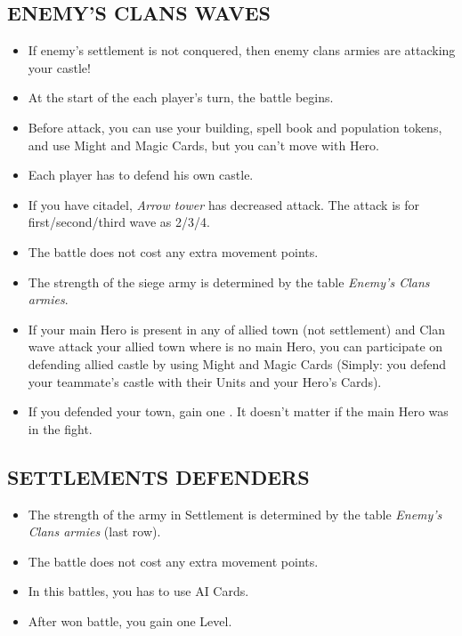 \begin{multicols*}{2}
\subsection*{\MakeUppercase{Enemy's clans waves}}
\begin{itemize}
  \item If enemy's settlement is not conquered, then enemy clans armies are attacking your castle!
  \item At the start of the each player's turn, the battle begins.
  \item Before attack, you can use your building, spell book and population tokens, and use Might and Magic Cards, but you can't move with Hero.
  \item Each player has to defend his own castle.
  \item If you have citadel, \textit{Arrow tower} has decreased attack. The attack is for first/second/third wave as 2/3/4.
  \item The battle does not cost any extra movement points.
  \item The strength of the siege army is determined by the table \textit{Enemy's Clans armies}.
  \item If your main Hero is present in any of allied town (not settlement) and Clan wave attack your allied town where is no main Hero, you can participate on defending allied castle by using Might and Magic Cards (Simply: you defend your teammate's castle with their Units and your Hero's Cards).
  \item If you defended your town, gain one . It doesn't matter if the main Hero was in the fight.
\end{itemize}

\subsection*{\MakeUppercase{Settlements defenders}}
\begin{itemize}
  \item The strength of the army in Settlement is determined by the table \textit{Enemy's Clans armies} (last row).
  \item The battle does not cost any extra movement points.
  \item In this battles, you has to use AI Cards.
  \item After won battle, you gain one Level.
\end{itemize}

\end{multicols*}

